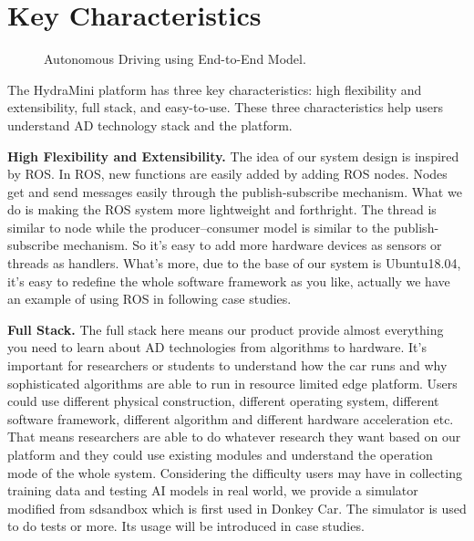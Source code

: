 \section{Key Characteristics}
\begin{figure}[t]
\centering
    \vspace{0.1in}
\caption{Autonomous Driving using End-to-End Model.}
\label{fig:end_to_end_autonomous_driving}
\end{figure}
The HydraMini platform has three key characteristics: high flexibility and extensibility, full stack, and easy-to-use. These three characteristics help users understand AD technology stack and the platform.

\textbf{High Flexibility and Extensibility. }The idea of our system design is inspired by ROS. In ROS, new functions are easily added by adding ROS nodes. Nodes get and send messages easily through the publish-subscribe mechanism. What we do is making the ROS system more lightweight and forthright. The thread is similar to node while the producer–consumer model is similar to the publish-subscribe mechanism. So it's easy to add more hardware devices as sensors or threads as handlers. What's more, due to the base of our system is Ubuntu18.04, it's easy to redefine the whole software framework as you like, actually we have an example of using ROS in following case studies.

\textbf{Full Stack. }The full stack here means our product provide almost everything you need to learn about AD technologies from algorithms to hardware. It's important for researchers or students to understand how the car runs and why sophisticated algorithms are able to run in resource limited edge platform. Users could use different physical construction, different operating system, different software framework, different algorithm and different hardware acceleration etc. That means researchers are able to do whatever research they want based on our platform and they could use existing modules and understand the operation mode of the whole system. Considering the difficulty users may have in collecting training data and testing AI models in real world, we provide a simulator modified from sdsandbox\cite{sdsandbox} which is first used in Donkey Car\cite{donkeycar}. The simulator is used to do tests or more. Its usage will be introduced in case studies.

